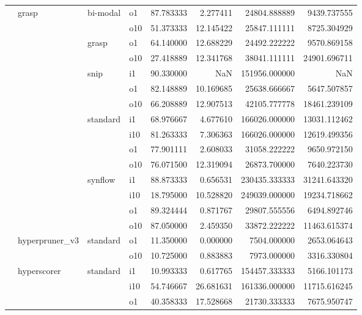\begin{longtable}{llllrrrr}
      & grasp & bi-modal & o1 &  87.783333 &   2.277411 &     24804.888889 &   9439.737555 \\
      &     &         & o10 &  51.373333 &  12.145422 &     25847.111111 &   8725.304929 \\
      &     & grasp & o1 &  64.140000 &  12.688229 &     24492.222222 &   9570.869158 \\
      &     &         & o10 &  27.418889 &  12.341768 &     38041.111111 &  24901.696711 \\
      &     & snip & i1 &  90.330000 &        NaN &    151956.000000 &           NaN \\
      &     &         & o1 &  82.148889 &  10.169685 &     25638.666667 &   5647.507857 \\
      &     &         & o10 &  66.208889 &  12.907513 &     42105.777778 &  18461.239109 \\
      &     & standard & i1 &  68.976667 &   4.677610 &    166026.000000 &  13031.112462 \\
      &     &         & i10 &  81.263333 &   7.306363 &    166026.000000 &  12619.499356 \\
      &     &         & o1 &  77.901111 &   2.608033 &     31058.222222 &   9650.972150 \\
      &     &         & o10 &  76.071500 &  12.319094 &     26873.700000 &   7640.223730 \\
      &     & synflow & i1 &  88.873333 &   0.656531 &    230435.333333 &  31241.643320 \\
      &     &         & i10 &  18.795000 &  10.528820 &    249039.000000 &  19234.718662 \\
      &     &         & o1 &  89.324444 &   0.871767 &     29807.555556 &   6494.892746 \\
      &     &         & o10 &  87.050000 &   2.459350 &     33872.222222 &  11463.615374 \\
      & hyperpruner\_v3 & standard & o1 &  11.350000 &   0.000000 &      7504.000000 &   2653.064643 \\
      &     &         & o10 &  10.725000 &   0.883883 &      7973.000000 &   3316.330804 \\
      & hyperscorer & standard & i1 &  10.993333 &   0.617765 &    154457.333333 &   5166.101173 \\
      &     &         & i10 &  54.746667 &  26.681631 &    161336.000000 &  11715.616245 \\
      &     &         & o1 &  40.358333 &  17.528668 &     21730.333333 &   7675.950747 \\

\end{longtable}
